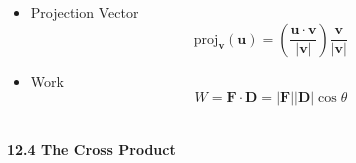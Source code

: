 \documentclass[12pt]{article}
\renewcommand{\vec}[1]{\mathbf{#1}}
\newcommand{\proj}{\textrm{proj}}
\newcommand{\<}{\left<}
\renewcommand{\>}{\right>}
\begin{document}
\begin{itemize}
    \item Projection Vector
      \[\proj_{\vec{v}}(\vec{u}) = \left(\frac{\vec{u}\cdot\vec{v}}{|\vec{v}|} \right)\frac{\vec{v}}{|\vec{v}|}\]

    \item Work
      \[W = \vec{F} \cdot \vec{D} = |\vec{F}||\vec{D}|\cos \theta\]\
    
    \end{itemize}
  
\newpage

\centerline{\bf 12.4 The Cross Product}
  
\end{document}
